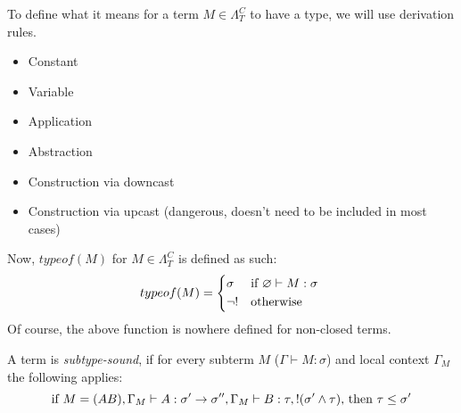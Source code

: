 \documentclass[main.tex]{subfiles}
\begin{document}
\begin{defn}
    To define what it means for a term $M \in \Lambda_T^C$ to have a type,
    we will use derivation rules.
    \begin{itemize}
        \item Constant
        \item Variable
        \item Application
        \item Abstraction
        \item Construction via downcast
        \item Construction via upcast (dangerous, doesn't need to be included in most cases)
    \end{itemize}

    Now, $typeof(M)$ for $M \in \Lambda_T^C$ is defined as such:
    \[
        typeof(M) =
        \begin{cases*}
            \sigma & if $\varnothing \vdash M : \sigma$ \\
            \neg ! & otherwise
        \end{cases*}
    \]
    Of course, the above function is nowhere defined for non-closed terms.
\end{defn}

\begin{defn}
    A term is \emph{subtype-sound}, if for every subterm $M$
    ($\Gamma \vdash M : \sigma$) and local context
    $\Gamma_M$ the following applies:
        \[ \text{if } M = (AB), \Gamma_M \vdash A : \sigma' \rightarrow \sigma'',
            \Gamma_M \vdash B : \tau,
            !(\sigma' \wedge \tau) \text{, then }
            \tau \leq \sigma' \]
\end{defn}
\end{document}
